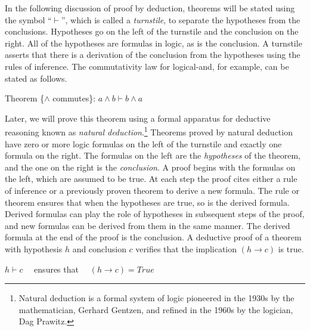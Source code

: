 In the following discussion of proof by deduction,
theorems will be stated using the symbol ``$\vdash$'',
which is called a \emph{turnstile},
to separate the hypotheses
from the conclusions.
Hypotheses go on the left of the turnstile and the conclusion on the right.
All of the hypotheses are formulas in logic, as is the conclusion.
A turnstile asserts that there is a derivation of the conclusion
from the hypotheses using the rules of inference.
The commutativity law for logical-and, for example,
can be stated as follows.
\begin{center}
Theorem \{$\wedge$ commutes\}: $a \wedge b \vdash b \wedge a$
\end{center}

Later, we will prove this theorem using a formal apparatus
for deductive reasoning known as
\emph{natural deduction}.\footnote{Natural
deduction is a formal system of logic pioneered in the 1930s
by the mathematician, Gerhard Gentzen, and refined in the 1960s
by the logician, Dag Prawitz.}
Theorems proved by natural deduction have zero or more
logic formulas on the left of the turnstile and exactly one formula on the right.
The formulas on the left are the \emph{hypotheses} of the theorem, and
the one on the right is the \emph{conclusion}.
A proof begins with the formulas on the left,
which are assumed to be true.
At each step the proof cites either a rule of inference or a previously proven theorem
to derive a new formula. The rule or theorem ensures that when the hypotheses are true,
so is the derived formula. Derived formulas can play the role of hypotheses
in subsequent steps of the proof, and new formulas can be derived from them
in the same manner. The derived formula at the end of the proof is the conclusion.
A deductive proof of a theorem with hypothesis $h$ and conclusion $c$
verifies that the implication $(h \rightarrow c)$ is true.
\begin{center}
$h \vdash c$ ~~ensures that~~ $(h \rightarrow c) = True$
\end{center}

